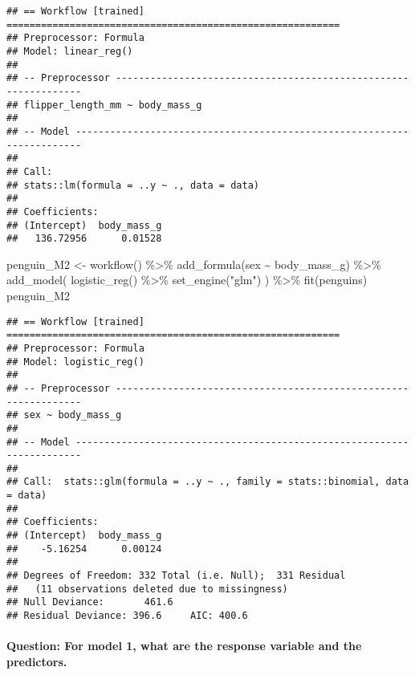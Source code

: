 \documentclass[
]{article}
\newenvironment{Shaded}{\begin{snugshade}}{\end{snugshade}}
\newcommand{\FunctionTok}[1]{\textcolor[rgb]{0.00,0.00,0.00}{#1}}
\newcommand{\NormalTok}[1]{#1}
\newcommand{\OtherTok}[1]{\textcolor[rgb]{0.56,0.35,0.01}{#1}}
\newcommand{\SpecialCharTok}[1]{\textcolor[rgb]{0.00,0.00,0.00}{#1}}
\newcommand{\StringTok}[1]{\textcolor[rgb]{0.31,0.60,0.02}{#1}}
\begin{document}
\begin{verbatim}
## == Workflow [trained] ==========================================================
## Preprocessor: Formula
## Model: linear_reg()
## 
## -- Preprocessor ----------------------------------------------------------------
## flipper_length_mm ~ body_mass_g
## 
## -- Model -----------------------------------------------------------------------
## 
## Call:
## stats::lm(formula = ..y ~ ., data = data)
## 
## Coefficients:
## (Intercept)  body_mass_g  
##   136.72956      0.01528
\end{verbatim}

\begin{Shaded}
\begin{Highlighting}[]
\NormalTok{penguin\_M2 }\OtherTok{\textless{}{-}} \FunctionTok{workflow}\NormalTok{() }\SpecialCharTok{\%\textgreater{}\%} 
  \FunctionTok{add\_formula}\NormalTok{(sex }\SpecialCharTok{\textasciitilde{}}\NormalTok{ body\_mass\_g) }\SpecialCharTok{\%\textgreater{}\%} 
  \FunctionTok{add\_model}\NormalTok{(}
    \FunctionTok{logistic\_reg}\NormalTok{() }\SpecialCharTok{\%\textgreater{}\%} 
      \FunctionTok{set\_engine}\NormalTok{(}\StringTok{"glm"}\NormalTok{)}
\NormalTok{  ) }\SpecialCharTok{\%\textgreater{}\%}
  \FunctionTok{fit}\NormalTok{(penguins) }
\NormalTok{penguin\_M2}
\end{Highlighting}
\end{Shaded}

\begin{verbatim}
## == Workflow [trained] ==========================================================
## Preprocessor: Formula
## Model: logistic_reg()
## 
## -- Preprocessor ----------------------------------------------------------------
## sex ~ body_mass_g
## 
## -- Model -----------------------------------------------------------------------
## 
## Call:  stats::glm(formula = ..y ~ ., family = stats::binomial, data = data)
## 
## Coefficients:
## (Intercept)  body_mass_g  
##    -5.16254      0.00124  
## 
## Degrees of Freedom: 332 Total (i.e. Null);  331 Residual
##   (11 observations deleted due to missingness)
## Null Deviance:       461.6 
## Residual Deviance: 396.6     AIC: 400.6
\end{verbatim}

\hypertarget{question-for-model-1-what-are-the-response-variable-and-the-predictors.}{%
\paragraph{Question: For model 1, what are the response variable and the
predictors.}\label{question-for-model-1-what-are-the-response-variable-and-the-predictors.}}
\end{document}
